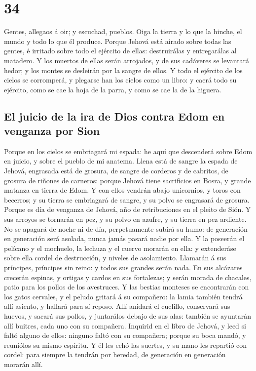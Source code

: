 \hypertarget{section-23-34}{%
\section{34}\label{section-23-34}}

 Gentes, allegaos á oir; y escuchad, pueblos. Oiga la
tierra y lo que la hinche, el mundo y todo lo que él produce.
 Porque Jehová está airado sobre todas las gentes, é
irritado sobre todo el ejército de ellas: destruirálas y entregarálas al
matadero.  Y los muertos de ellas serán arrojados, y de
sus cadáveres se levantará hedor; y los montes se desleirán por la
sangre de ellos.  Y todo el ejército de los cielos se
corromperá, y plegarse han los cielos como un libro: y caerá todo su
ejército, como se cae la hoja de la parra, y como se cae la de la
higuera.

\hypertarget{el-juicio-de-la-ira-de-dios-contra-edom-en-venganza-por-sion}{%
\subsection{El juicio de la ira de Dios contra Edom en venganza por
Sion}\label{el-juicio-de-la-ira-de-dios-contra-edom-en-venganza-por-sion}}

 Porque en los cielos se embriagará mi espada: he aquí que
descenderá sobre Edom en juicio, y sobre el pueblo de mi anatema.
 Llena está de sangre la espada de Jehová, engrasada está
de grosura, de sangre de corderos y de cabritos, de grosura de riñones
de carneros: porque Jehová tiene sacrificios en Bosra, y grande matanza
en tierra de Edom.  Y con ellos vendrán abajo unicornios,
y toros con becerros; y su tierra se embriagará de sangre, y su polvo se
engrasará de grosura.  Porque es día de venganza de
Jehová, año de retribuciones en el pleito de Sión.  Y sus
arroyos se tornarán en pez, y su polvo en azufre, y su tierra en pez
ardiente.  No se apagará de noche ni de día,
perpetuamente subirá su humo: de generación en generación será asolada,
nunca jamás pasará nadie por ella.  Y la poseerán el
pelícano y el mochuelo, la lechuza y el cuervo morarán en ella: y
extenderáse sobre ella cordel de destrucción, y niveles de asolamiento.
 Llamarán á sus príncipes, príncipes sin reino: y todos
sus grandes serán nada.  En sus alcázares crecerán
espinas, y ortigas y cardos en sus fortalezas; y serán morada de
chacales, patio para los pollos de los avestruces.  Y las
bestias monteses se encontrarán con los gatos cervales, y el peludo
gritará á su compañero: la lamia también tendrá allí asiento, y hallará
para sí reposo.  Allí anidará el cuclillo, conservará sus
huevos, y sacará sus pollos, y juntarálos debajo de sus alas: también se
ayuntarán allí buitres, cada uno con su compañera. 
Inquirid en el libro de Jehová, y leed si faltó alguno de ellos: ninguno
faltó con su compañera; porque su boca mandó, y reuniólos su mismo
espíritu.  Y él les echó las suertes, y su mano les
repartió con cordel: para siempre la tendrán por heredad, de generación
en generación morarán allí.

